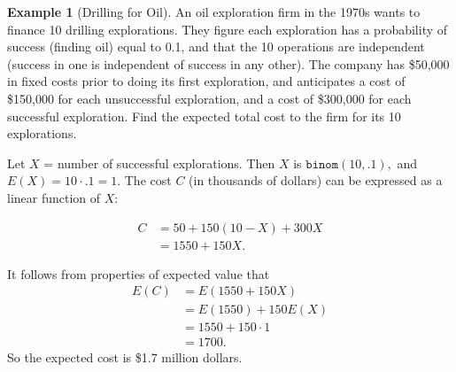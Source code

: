 \documentclass[
]{book}
\theoremstyle{definition}
\theoremstyle{definition}
\newtheorem{example}{Example}[chapter]
\theoremstyle{definition}
\theoremstyle{definition}
\theoremstyle{remark}
\begin{document}
\begin{example}[Drilling for Oil]
\protect\hypertarget{exm:binomial-oil}{}\label{exm:binomial-oil}An oil exploration firm in the 1970s wants to finance 10 drilling explorations. They figure each exploration has a probability of success (finding oil) equal to 0.1, and that the 10 operations are independent (success in one is independent of success in any other). The company has \$50,000 in fixed costs prior to doing its first exploration, and anticipates a cost of \$150,000 for each unsuccessful exploration, and a cost of \$300,000 for each successful exploration. Find the expected total cost to the firm for its 10 explorations.

Let \(X\) = number of successful explorations. Then \(X\) is \(\texttt{binom}(10,.1),\) and \(E(X) = 10 \cdot .1 = 1.\)
The cost \(C\) (in thousands of dollars) can be expressed as a linear function of \(X\):

\begin{align*}
C &= 50 + 150(10-X)+300X\\
  &= 1550 + 150X.
\end{align*}

It follows from properties of expected value that
\begin{align*}
E(C) &= E(1550 + 150X)\\
     &= E(1550) + 150E(X)\\
     &= 1550 + 150 \cdot 1 \\
     &= 1700.
\end{align*}
So the expected cost is \$1.7 million dollars.
\end{example}
\end{document}
